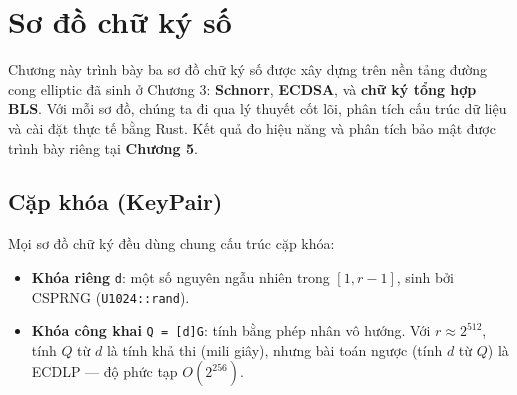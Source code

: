 
\clearpage
{}

\setcounter{chapter}{3}
\chapter[Sơ đồ chữ ký số]{Sơ đồ chữ ký số}

Chương này trình bày ba sơ đồ chữ ký số được xây dựng trên nền tảng
đường cong elliptic đã sinh ở Chương 3: \textbf{Schnorr},
\textbf{ECDSA}, và \textbf{chữ ký tổng hợp BLS}. Với mỗi sơ đồ, chúng ta
đi qua lý thuyết cốt lõi, phân tích cấu trúc dữ liệu và cài đặt thực tế
bằng Rust. Kết quả đo hiệu năng và phân tích bảo mật được trình bày
riêng tại \textbf{Chương 5}.

\section{Cặp khóa (KeyPair)}\label{cux1eb7p-khuxf3a-keypair}

Mọi sơ đồ chữ ký đều dùng chung cấu trúc cặp khóa:

\begin{Shaded}
\begin{Highlighting}[]
 \OperatorTok{\textless{}}\OperatorTok{:}\OperatorTok{\textgreater{}} \OperatorTok{\{}
    \OperatorTok{:}\OperatorTok{,}        
    \OperatorTok{:}\OperatorTok{\textless{}}\OperatorTok{\textgreater{},} 
\OperatorTok{\}}
\end{Highlighting}
\end{Shaded}

\label{lst:ch4_keypair}\vspace{12pt}

\begin{itemize}
\tightlist
\item
  \textbf{Khóa riêng} \texttt{d}: một số nguyên ngẫu nhiên trong
  \([1, r-1]\), sinh bởi CSPRNG (\texttt{U1024::rand}).
\item
  \textbf{Khóa công khai} \texttt{Q\ =\ {[}d{]}G}: tính bằng phép nhân
  vô hướng. Với \(r \approx 2^{512}\), tính \(Q\) từ \(d\) là tính khả
  thi (mili giây), nhưng bài toán ngược (tính \(d\) từ \(Q\)) là ECDLP
  --- độ phức tạp \(O(2^{256})\).
\end{itemize}

